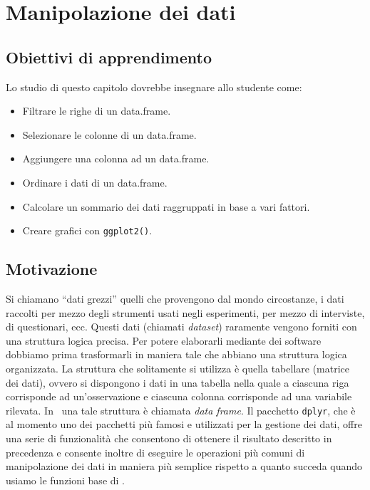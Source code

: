 \chapter{Manipolazione dei dati}
\label{chapter:tidyverse}  


\section*{Obiettivi di apprendimento}

Lo studio di questo capitolo dovrebbe insegnare allo studente come:
\begin{itemize}
\item 
  Filtrare le righe di un data.frame.
\item 
  Selezionare le colonne di un data.frame.
\item
  Aggiungere una colonna ad un data.frame.
\item 
  Ordinare i dati di un data.frame.
\item
  Calcolare un sommario dei dati raggruppati in base a vari fattori.
\item 
  Creare grafici con \texttt{ggplot2()}.
\end{itemize}


\section*{Motivazione}

Si chiamano ``dati grezzi'' quelli che provengono dal mondo circostanze, i dati raccolti per mezzo degli strumenti usati negli esperimenti, per mezzo di interviste, di questionari, ecc. 
Questi dati (chiamati \emph{dataset}) raramente vengono forniti con una struttura logica precisa.  
Per potere elaborarli mediante dei software dobbiamo prima trasformarli in maniera tale che abbiano una struttura logica organizzata. 
La struttura che solitamente si utilizza è quella tabellare (matrice dei dati), ovvero si dispongono i dati in una tabella nella quale a ciascuna riga corrisponde ad un'osservazione e ciascuna colonna corrisponde ad una variabile rilevata. 
In \R\, una tale struttura è chiamata \emph{data frame}. 
Il pacchetto \verb+dplyr+, che è al momento uno dei pacchetti più famosi e utilizzati per la gestione dei dati, offre una serie di funzionalità che consentono di ottenere il risultato descritto in precedenza e consente inoltre di eseguire le operazioni più comuni di manipolazione dei dati in maniera più semplice rispetto a quanto succeda quando usiamo le funzioni base di \R. 

